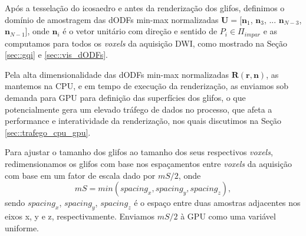 Após a tesselação do icosaedro e antes da renderização dos glifos, definimos o domínio de amostragem das dODFs min-max normalizadas $\mathbf{U} = [
\mathbf{n}_1$,
$\mathbf{n}_3$, ...
$\mathbf{n}_{N-3}$,
$\mathbf{n}_{N-1}]$, onde $\mathbf{n}_i$ é o vetor unitário com direção e sentido de $P_i \in \Pi_{impar}$
e as computamos para todos os \textit{voxels} da aquisição DWI, como mostrado na Seção \ref{sec::gqi} e \ref{sec::vis_dODFs}.

Pela alta dimensionalidade das dODFs min-max normalizadas $\boldsymbol{R}(\mathbf{r}, \mathbf{n})$, as mantemos na CPU, e em tempo de execução da renderização, as enviamos sob demanda para GPU para definição das superfícies dos glifos, o que potencialmente gera um elevado tráfego de dados no processo, que afeta a performance e interatividade da renderização, nos quais discutimos na Seção \ref{sec::trafego_cpu_gpu}.

Para ajustar o tamanho dos glifos ao tamanho dos seus respectivos \textit{voxels}, redimensionamos os glifos com base nos espaçamentos entre \textit{voxels} da aquisição \cite{voltoline2021} com base em um fator de escala dado por $mS/2$, onde
\begin{equation}
    mS = min(spacing_x, spacing_y, spacing_z),
\end{equation}
sendo  $spacing_x$, $spacing_y$, $spacing_z$ é o espaço entre duas amostras adjacentes nos eixos x, y e z, respectivamente. Enviamos $mS/2$ à GPU como uma variável uniforme.







